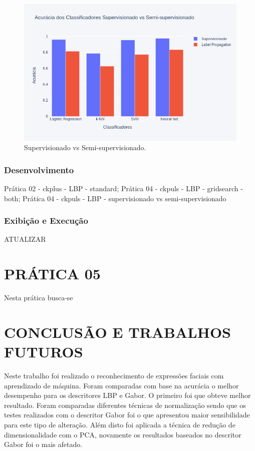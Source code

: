 \documentclass[a4paper, 12 pt, conference]{ieeeconf}  %
\begin{document}
\begin{figure}[!htbp]
	\centering
	\includegraphics[width=1.0\linewidth,clip=true,trim=0cm 0cm 0cm 0cm, keepaspectratio=true]{bar_supervisionado_vs_semi_lbp.png}
	\caption{Supervisionado vs Semi-supervisionado.}
	\label{fig:super_vs_semi_lbp}
\end{figure}

\subsubsection{Desenvolvimento} Prática 02 - ckplus  - LBP - standard; Prática 04 - ckpuls - LBP - gridsearch - both; Prática 04 - ckpuls - LBP - supervisionado vs  semi-supervisionado
\subsubsection{Exibição e Execução} ATUALIZAR

\section{PRÁTICA 05}
\label{pratica05}

Nesta prática busca-se
\section{CONCLUSÃO E TRABALHOS FUTUROS}

Neste trabalho foi realizado o reconhecimento de expressões faciais com aprendizado de máquina. Foram comparadas com base na acurácia o melhor desempenho para os descritores LBP e Gabor. O primeiro foi que obteve melhor resultado. Foram comparadas diferentes técnicas de normalização sendo que os testes realizados com o descritor Gabor foi o que apresentou maior sensibilidade para este tipo de alteração. Além disto foi aplicada a técnica de redução de dimensionalidade com o PCA, novamente os resultados baseados no descritor Gabor foi o mais afetado.



\end{document}
